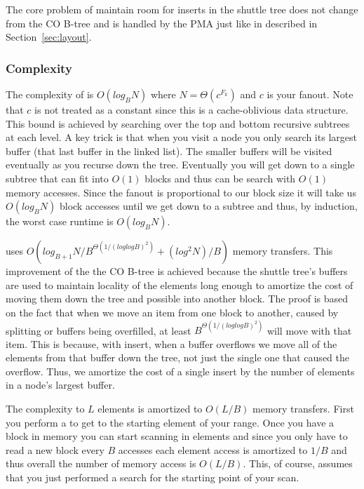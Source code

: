 \documentclass{style}
\begin{document}
The core problem of maintain room for inserts in the shuttle tree does not
change from the CO B-tree and is handled by the PMA just like in described in
Section~\ref{sec:layout}.

\subsubsection{Complexity}

The complexity of \Search is $O(log_B N)$ where $N = \Theta(c^{F_k})$ and $c$
is your fanout. Note that $c$ is not treated as a constant since this is a
cache-oblivious data structure. This bound is achieved by searching over the
top and bottom recursive subtrees at each level. A key trick is that when you
visit a node you only search its largest buffer (that last buffer in the
linked list). The smaller buffers will be visited eventually as you recurse
down the tree. Eventually you will get down to a single subtree that can fit
into $O(1)$ blocks and thus can be search with $O(1)$ memory accesses. Since
the fanout is proportional to our block size it will take us $O(log_B N)$
block accesses until we get down to a subtree and thus, by induction, the
worst case runtime is $O(log_B N)$.

\Insert uses $O(log_{B+1} N / B^{\Theta(1/(loglogB)^2)} + (log^2 N) / B)$
memory transfers. This improvement of the the CO B-tree is achieved because
the shuttle tree's buffers are used to maintain locality of the elements long
enough to amortize the cost of moving them down the tree and possible into
another block. The proof is based on the fact that when we move an item from
one block to another, caused by splitting or buffers being overfilled, at
least $B^{\Theta(1/(loglogB)^2)}$ will move with that item. This is because,
with insert, when a buffer overflows we move all of the elements from that
buffer down the tree, not just the single one that caused the overflow. Thus,
we amortize the cost of a single insert by the number of elements in a node's
largest buffer.

The complexity to \Scan $L$ elements is amortized to $O(L/B)$ memory
transfers. First you perform a \Search to get to the starting element of your
range. Once you have a block in memory you can start scanning in elements and
since you only have to read a new block every $B$ accesses each element access
is amortized to $1/B$ and thus overall the number of memory access is
$O(L/B)$. This, of course, assumes that you just performed a search for the
starting point of your scan.
\end{document}
